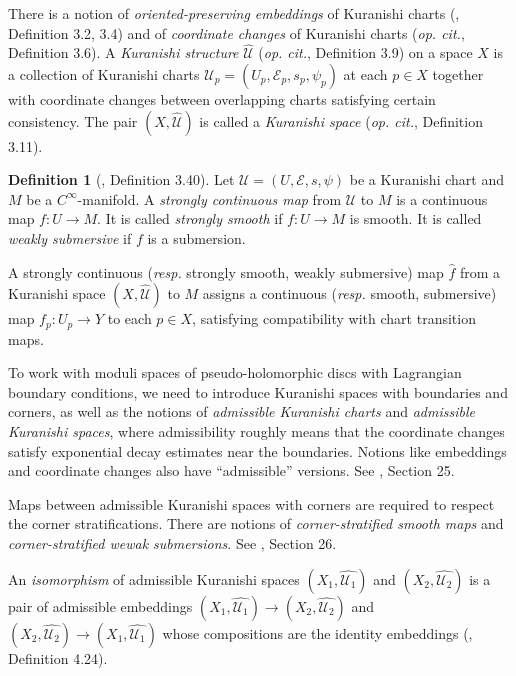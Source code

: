 \documentclass[10pt]{amsart}
\numberwithin{equation}{section}
\theoremstyle{plain}
\theoremstyle{definition}
\newtheorem{definition}[theorem]{Definition}
\theoremstyle{remark}
\numberwithin{equation}{section}
\newcommand{\wh}[1]{\widehat{#1}}
\begin{document}
{There is a notion of \emph{oriented-preserving embeddings} of  Kuranishi charts (\cite{FOOO20book}, Definition 3.2, 3.4) and of \emph{coordinate changes }of Kuranishi charts (\emph{op. cit.}, Definition 3.6). A \emph{Kuranishi structure} $\wh{\mathscr{U}}$ (\emph{op. cit.}, Definition 3.9) on a space $X$ is a collection of Kuranishi charts $\mathscr{U}_p=(U_p,\mathscr{E}_p,s_p,\psi_p)$ at each $p\in X$ together with coordinate changes between overlapping charts satisfying certain consistency. The pair $(X,\wh{\mathscr{U}})$ is called a \emph{Kuranishi space} (\emph{op. cit.}, Definition 3.11).

\begin{definition}[\cite{FOOO20book}, Definition 3.40]
	Let $\mathscr{U}=(U,\mathscr{E},s,\psi)$ be a Kuranishi chart and $M$ be a $C^\infty$-manifold.
	A \emph{strongly continuous map} from $\mathscr{U}$ to $M$ is a continuous map $f\colon U\to M$. It is called \emph{strongly smooth} if $f\colon U\to M$ is smooth.  It is called \emph{weakly submersive} if $f$ is a submersion.
	
	A strongly continuous (\textit{resp.} strongly smooth, weakly submersive) map $\wh{f}$ from a Kuranishi space $(X,\wh{\mathscr{U}})$ to $M$  assigns a continuous (\textit{resp.} smooth, submersive) map $f_p\colon U_p\to Y$ to each $p\in X$, satisfying compatibility with chart transition maps.
\end{definition}



To work with moduli spaces of pseudo-holomorphic discs with Lagrangian boundary conditions, we need to introduce Kuranishi spaces with boundaries and corners, as well as the notions of \emph{admissible Kuranishi charts} and \emph{admissible Kuranishi spaces}, where admissibility roughly means that the coordinate changes satisfy exponential decay estimates near the boundaries. Notions like embeddings and coordinate changes also have ``admissible'' versions. See \cite{FOOO20book}, Section 25.

Maps between admissible Kuranishi spaces with corners are required to respect the corner stratifications. There are notions of \emph{corner-stratified smooth maps} and \emph{corner-stratified wewak submersions}. See \cite{FOOO20book}, Section 26.

An \emph{isomorphism} of admissible Kuranishi spaces $(X_1,\wh{\mathscr{U}_1})$ and   $(X_2,\wh{\mathscr{U}_2})$ is a pair of admissible embeddings $(X_1,\wh{\mathscr{U}_1})\to (X_2,\wh{\mathscr{U}_2})$ and $(X_2,\wh{\mathscr{U}_2})\to (X_1,\wh{\mathscr{U}_1})$ whose compositions are the identity embeddings (\cite{FOOO20book}, Definition 4.24).


}
\end{document}
